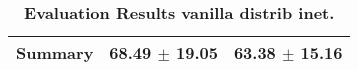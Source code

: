 \begin{table}[htb]
{\begin{tabular}{lll}
\midrule
\textbf{Summary                                  } &                  \phantom{0}68.49 $\pm$ 19.05 &                      \phantom{0}63.38 $\pm$ 15.16 \\
\bottomrule
\end{tabular}%
}
\caption{\textbf{Evaluation Results vanilla distrib inet.}}
\label{tab:eval-results}
\end{table}
